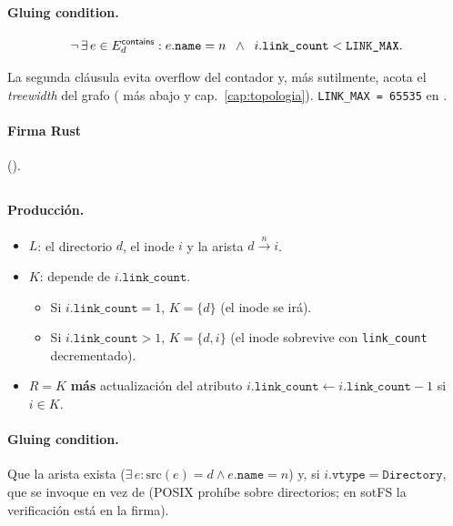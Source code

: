 \paragraph{Gluing condition.}
\[
  \neg\,\exists\,e \in E_d^{\textsf{contains}} : e.\texttt{name} = n
  \;\;\wedge\;\;
  i.\texttt{link\_count} < \texttt{LINK\_MAX}.
\]

La segunda cláusula evita overflow del contador y, más sutilmente,
acota el \emph{treewidth} del grafo
( más abajo y cap.~\ref{cap:topologia}).
\texttt{LINK\_MAX = 65535} en
.

\paragraph{Firma Rust} ().

\subsection{\opunlink}

\paragraph{Producción.}

\begin{itemize}
  \item $L$: el directorio $d$, el inode $i$ y la arista \econtains{}
    $d \xrightarrow{n} i$.
  \item $K$: depende de $i.\texttt{link\_count}$.
    \begin{itemize}
      \item Si $i.\texttt{link\_count} = 1$, $K = \{d\}$ (el inode se
        irá).
      \item Si $i.\texttt{link\_count} > 1$, $K = \{d, i\}$ (el inode
        sobrevive con \texttt{link\_count} decrementado).
    \end{itemize}
  \item $R = K$ \textbf{más} actualización del atributo
    $i.\texttt{link\_count} \leftarrow i.\texttt{link\_count} - 1$ si $i \in K$.
\end{itemize}

\paragraph{Gluing condition.} Que la arista exista
($\exists\,e: \mathrm{src}(e)=d \wedge e.\texttt{name}=n$) y, si
$i.\texttt{vtype} = \texttt{Directory}$, que se invoque \oprmdir{} en
vez de \opunlink{} (POSIX prohíbe \opunlink{} sobre directorios; en
sotFS la verificación está en la firma).

